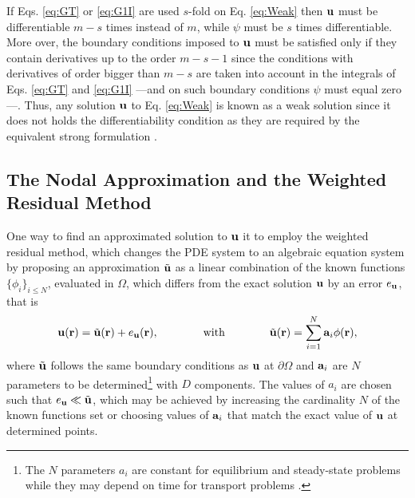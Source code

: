 %
If  Eqs. \eqref{eq:GT} or \eqref{eq:G1I} are used $s$-fold on Eq. \eqref{eq:Weak} then $\vb{u}$ must be differentiable $m-s$ times instead of $m$, while $\psi$ must be $s$ times differentiable. More over, the boundary conditions imposed to $\vb{u}$ must be satisfied only if they contain  derivatives up to the order $m-s-1$ since the conditions with derivatives of order bigger than $m-s$ are taken into account in the integrals of Eqs. \eqref{eq:GT} and \eqref{eq:G1I} ---and on such boundary conditions $\psi$ must equal zero---. Thus, any solution $\vb{u}$ to Eq. \eqref{eq:Weak} is known as a weak solution  since it does not holds the differentiability condition as they are required by the equivalent strong formulation \cite{dhatt_finite_2012}.

    \subsection{The Nodal Approximation and the Weighted Residual Method}

         One way to find an approximated solution to $\vb{u}$ it to employ the weighted residual method, which changes the PDE system to an algebraic equation system by proposing an approximation  $\tilde{\vb{u}}$ as a linear combination of the known functions $\{\phi_i\}_{i\leq N}$, evaluated in $\Omega$, which differs from the exact solution $\vb{u}$ by an error $e_{\vb{u}}$, that is \cite{dhatt_finite_2012,larson_finite_2013,fletcher_computational_1984}
        \begin{align}
            \vb{u}(\vb{r}) = \tilde{\vb{u}}(\vb{r}) + e_{\vb{u}}(\vb{r}),
                \qquad\qquad
                \text{with}
                \qquad\qquad
                \tilde{\vb{u}}(\vb{r}) = \sum_{i = 1}^{N} \vb{a}_i\phi(\vb{r}),
            \label{eq:uapprox}
        \end{align}
         where $\tilde{\vb{u}}$ follows the same boundary conditions as $\vb{u}$ at $\partial\Omega$ and $\vb{a}_i$ are $N$ parameters to be determined\footnote{The $N$ parameters $a_i$ are constant for equilibrium and steady-state problems while they may depend on time for transport problems \cite{dhatt_finite_2012}.} with $D$ components. The values of $a_i$ are chosen such that $e_{\vb{u}}\ll  \tilde{\vb{u}} $, which may be achieved by increasing the cardinality $N$ of the known functions set  or choosing values of $\vb{a}_i$ that match the exact value of $\vb{u}$ at determined points.

